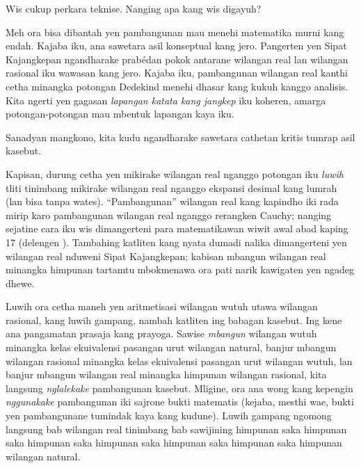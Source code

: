 \documentclass[../../../include/open-logic-section]{subfiles}
\begin{document}

Wis cukup perkara teknise. Nanging apa kang wis digayuh?

Meh ora bisa dibantah yen pambangunan mau menehi matematika murni kang
{endah}. Kajaba iku, ana sawetara asil konseptual kang jero. Pangerten yen
Sipat Kajangkepan ngandharake prabédan pokok antarane wilangan real lan
wilangan rasional iku wawasan kang jero. Kajaba iku, pambangunan wilangan
real kanthi cetha minangka potongan Dedekind menehi dhasar kang kukuh
kanggo analisis. Kita ngerti yen gagasan \emph{lapangan katata kang
jangkep} iku koheren, amarga potongan-potongan mau mbentuk lapangan kaya iku.

Sanadyan mangkono, kita kudu ngandharake sawetara cathetan kritis tumrap
asil kasebut.

Kapisan, durung cetha yen mikirake wilangan real nganggo potongan iku
\emph{luwih} tliti tinimbang mikirake wilangan real nganggo ekspansi
desimal kang lumrah (lan bisa tanpa wates). ``Pambangunan'' wilangan real
kang kapindho iki rada mirip karo pambangunan wilangan real nganggo
rerangken Cauchy; nanging sejatine cara iku wis dimangerteni para
matematikawan wiwit awal abad kaping 17 (delengen ).
Tambahing katliten kang nyata dumadi nalika dimangerteni yen wilangan
real nduweni Sipat Kajangkepan; kabisan mbangun wilangan real minangka
himpunan tartamtu mbokmenawa ora pati narik kawigaten yen ngadeg dhewe.

Luwih ora cetha maneh yen aritmetisasi wilangan wutuh utawa wilangan
rasional, kang luwih gampang, nambah katliten ing babagan kasebut.
Ing kene ana pangamatan prasaja kang prayoga. Sawise \emph{mbangun}
wilangan wutuh minangka kelas ekuivalensi pasangan urut wilangan natural,
banjur mbangun wilangan rasional minangka kelas ekuivalensi pasangan urut
wilangan wutuh, lan banjur mbangun wilangan real minangka himpunan wilangan
rasional, kita langsung \emph{nglalekake} pambangunan kasebut. Mligine,
ora ana wong kang kepengin \emph{nggunakake} pambangunan iki sajrone bukti
matematis (kejaba, mesthi wae, bukti yen pambangunane tumindak kaya kang
kudune). Luwih gampang ngomong langsung bab wilangan real tinimbang bab
sawijining himpunan saka himpunan saka himpunan saka himpunan saka himpunan
saka himpunan saka himpunan wilangan natural.
%
%
%
\end{document}

